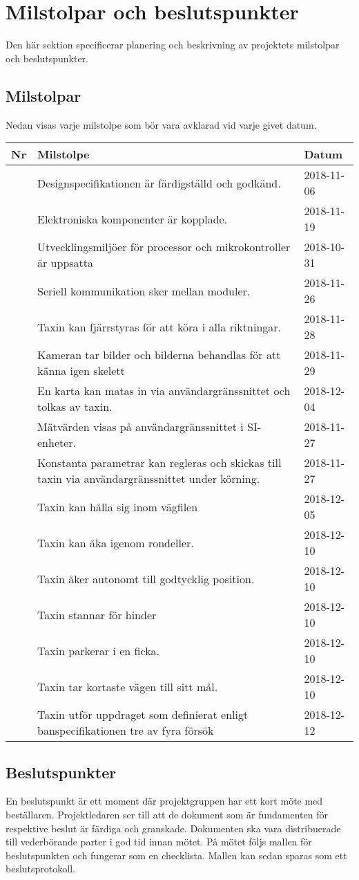 \documentclass[projektplan/plan.tex]{subfiles}
\newcounter{milestoneNo} %
\newenvironment{milestonelist}
{
    \setlength{\tabcolsep}{12pt}
    \renewcommand{\arraystretch}{1.6}
    \begin{longtable}{p{8mm}p{105mm}p{25mm}}
        \bfseries Nr &
        \bfseries Milstolpe &
        \bfseries Datum 
	\\\hline\endhead
}{
    \end{longtable}
}
\newcommand{\milestone}[2]{
    \stepcounter{milestoneNo}
    \arabic{milestoneNo} & #1     & #2 \\
}
\begin{document}
\section{Milstolpar och beslutspunkter}
Den här sektion specificerar planering och beskrivning av projektets milstolpar
och beslutspunkter.

\subsection{Milstolpar}
Nedan visas varje milstolpe som bör vara avklarad vid varje givet datum.
\begin{milestonelist}
    \milestone{Designspecifikationen är färdigställd och godkänd.}{2018-11-06}
    \milestone{Elektroniska komponenter är kopplade.}{2018-11-19}
    \milestone{Utvecklingsmiljöer för processor och mikrokontroller är
    uppsatta}{2018-10-31}
    \milestone{Seriell kommunikation sker mellan moduler.}{2018-11-26}
    \milestone{Taxin kan fjärrstyras för att köra i alla
    riktningar.}{2018-11-28}
    \milestone{Kameran tar bilder och bilderna behandlas för att känna igen
    skelett}{2018-11-29}
    \milestone{En karta kan matas in via användargränssnittet och tolkas av
    taxin.}{2018-12-04}
    \milestone{Mätvärden visas på användargränssnittet i
    SI-enheter.}{2018-11-27}
    \milestone{Konstanta parametrar kan regleras och skickas till taxin via
    användargränssnittet under körning.}{2018-11-27}
    \milestone{Taxin kan hålla sig inom vägfilen}{2018-12-05}
    \milestone{Taxin kan åka igenom rondeller.}{2018-12-10}
    \milestone{Taxin åker autonomt till godtycklig position.}{2018-12-10}
    \milestone{Taxin stannar för hinder}{2018-12-10}
    \milestone{Taxin parkerar i en ficka.}{2018-12-10}
    \milestone{Taxin tar kortaste vägen till sitt mål.}{2018-12-10}
    \milestone{Taxin utför uppdraget som definierat enligt banspecifikationen
    tre av fyra försök}{2018-12-12}
\end{milestonelist}

\subsection{Beslutspunkter}
En beslutspunkt är ett moment där projektgruppen har ett kort möte med
beställaren. Projektledaren ser till att de dokument som är fundamenten för
respektive beslut är färdiga och granskade. Dokumenten ska vara distribuerade
till vederbörande parter i god tid innan mötet. På mötet följs mallen för
beslutspunkten och fungerar som en checklista. Mallen kan sedan sparas som ett
beslutsprotokoll.
\end{document}
